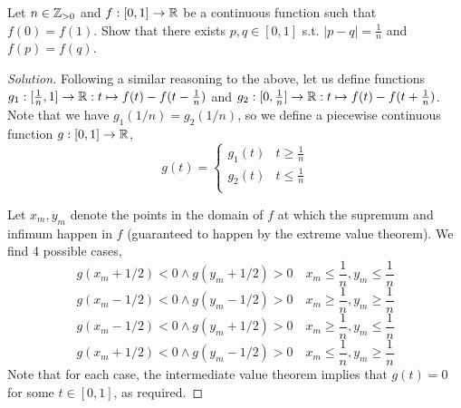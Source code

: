 \begin{example}[Generalisation]
  Let $n\in\mathbb Z_{>0}$ and $f:[0,1]\to\mathbb R$ be a continuous function such that $f(0)=f(1)$.
  Show that there exists $p,q\in[0,1]$ s.t. $|p-q|=\frac{1}{n}$ and $f(p)=f(q)$.
\end{example}
\begin{proof}[Solution]
  Following a similar reasoning to the above, let us define functions
  $g_1:[\frac{1}{n},1]\to\mathbb R:t\mapsto f(t)-f(t-\frac{1}{n})$ and
  $g_2:[0,\frac{1}{n}]\to\mathbb R:t\mapsto f(t)-f(t+\frac{1}{n})$. Note that we have
  $g_1(1/n)=g_2(1/n)$, so we define a piecewise continuous function $g:[0,1]\to\mathbb R$,
  \[
    g(t)=\begin{cases} 
      g_1(t) & t\geq \frac{1}{n} \\
      g_2(t) & t\leq \frac{1}{n} \\
    \end{cases}
  \]
  
  Let $x_m,y_m$ denote the points in the domain of $f$ at which the supremum and infimum
  happen in $f$ (guaranteed to happen by the extreme value theorem). We find 4 possible
  cases,
  \[g(x_m+1/2)<0 \land g(y_m+1/2)>0 \quad x_m\leq\frac{1}{n},y_m\leq\frac{1}{n}\]
  \[g(x_m-1/2)<0 \land g(y_m-1/2)>0 \quad x_m\geq\frac{1}{n},y_m\geq\frac{1}{n}\]
  \[g(x_m-1/2)<0 \land g(y_m+1/2)>0 \quad x_m\geq\frac{1}{n},y_m\leq\frac{1}{n}\]
  \[g(x_m+1/2)<0 \land g(y_m-1/2)>0 \quad x_m\leq\frac{1}{n},y_m\geq\frac{1}{n}\]
  Note that for each case, the intermediate value theorem implies that $g(t)=0$ for
  some $t\in [0,1]$, as required.

\end{proof}
